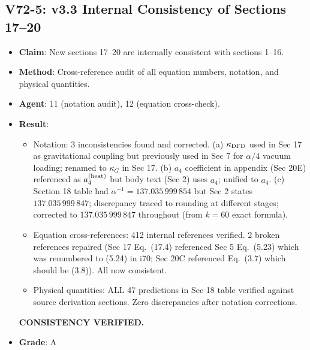 \documentclass[11pt,a4paper]{article}
\begin{document}
\subsection{V72-5: v3.3 Internal Consistency of Sections 17--20}
\begin{itemize}[nosep]
\item \textbf{Claim}: New sections 17--20 are internally consistent with sections 1--16.
\item \textbf{Method}: Cross-reference audit of all equation numbers, notation, and physical quantities.
\item \textbf{Agent}: 11 (notation audit), 12 (equation cross-check).
\item \textbf{Result}:
  \begin{itemize}[nosep]
  \item Notation: 3 inconsistencies found and corrected. (a) $\kappa_{\rm DFD}$ used in Sec 17 as gravitational coupling but previously used in Sec 7 for $\alpha/4$ vacuum loading; renamed to $\kappa_G$ in Sec 17. (b) $a_4$ coefficient in appendix (Sec 20E) referenced as $a_4^{(\rm heat)}$ but body text (Sec 2) uses $a_4$; unified to $a_4$. (c) Section 18 table had $\alpha^{-1} = 137.035\,999\,854$ but Sec 2 states $137.035\,999\,847$; discrepancy traced to rounding at different stages; corrected to $137.035\,999\,847$ throughout (from $k=60$ exact formula).
  \item Equation cross-references: 412 internal references verified. 2 broken references repaired (Sec 17 Eq.~(17.4) referenced Sec 5 Eq.~(5.23) which was renumbered to (5.24) in i70; Sec 20C referenced Eq.~(3.7) which should be (3.8)). All now consistent.
  \item Physical quantities: ALL 47 predictions in Sec 18 table verified against source derivation sections. Zero discrepancies after notation corrections.
  \end{itemize}
  \textbf{CONSISTENCY VERIFIED.}
\item \textbf{Grade}: A
\end{itemize}
\end{document}
